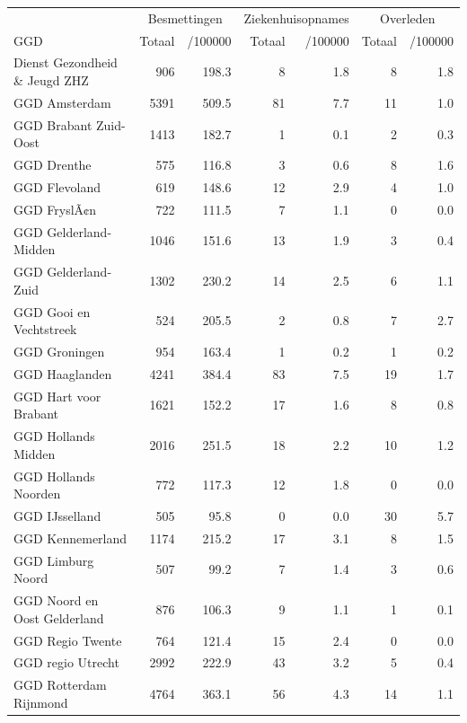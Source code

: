\documentclass[
  english,
  man,floatsintext]{apa6}
\begin{document}
\begin{table}[H]
\centering\begingroup\fontsize{10}{12}\selectfont

\begin{threeparttable}
\begin{tabular}{lrrrrrr}
\toprule
\multicolumn{1}{c}{ } & \multicolumn{2}{c}{Besmettingen} & \multicolumn{2}{c}{Ziekenhuisopnames} & \multicolumn{2}{c}{Overleden} \\
\cmidrule(l{3pt}r{3pt}){2-3} \cmidrule(l{3pt}r{3pt}){4-5} \cmidrule(l{3pt}r{3pt}){6-7}
GGD & Totaal & /100000 & Totaal & /100000 & Totaal & /100000\\
\midrule
Dienst Gezondheid \& Jeugd ZHZ & 906 & 198.3 & 8 & 1.8 & 8 & 1.8\\
GGD Amsterdam & 5391 & 509.5 & 81 & 7.7 & 11 & 1.0\\
GGD Brabant Zuid-Oost & 1413 & 182.7 & 1 & 0.1 & 2 & 0.3\\
GGD Drenthe & 575 & 116.8 & 3 & 0.6 & 8 & 1.6\\
GGD Flevoland & 619 & 148.6 & 12 & 2.9 & 4 & 1.0\\
GGD FryslÃ¢n & 722 & 111.5 & 7 & 1.1 & 0 & 0.0\\
GGD Gelderland-Midden & 1046 & 151.6 & 13 & 1.9 & 3 & 0.4\\
GGD Gelderland-Zuid & 1302 & 230.2 & 14 & 2.5 & 6 & 1.1\\
GGD Gooi en Vechtstreek & 524 & 205.5 & 2 & 0.8 & 7 & 2.7\\
GGD Groningen & 954 & 163.4 & 1 & 0.2 & 1 & 0.2\\
GGD Haaglanden & 4241 & 384.4 & 83 & 7.5 & 19 & 1.7\\
GGD Hart voor Brabant & 1621 & 152.2 & 17 & 1.6 & 8 & 0.8\\
GGD Hollands Midden & 2016 & 251.5 & 18 & 2.2 & 10 & 1.2\\
GGD Hollands Noorden & 772 & 117.3 & 12 & 1.8 & 0 & 0.0\\
GGD IJsselland & 505 & 95.8 & 0 & 0.0 & 30 & 5.7\\
GGD Kennemerland & 1174 & 215.2 & 17 & 3.1 & 8 & 1.5\\
GGD Limburg Noord & 507 & 99.2 & 7 & 1.4 & 3 & 0.6\\
GGD Noord en Oost Gelderland & 876 & 106.3 & 9 & 1.1 & 1 & 0.1\\
GGD Regio Twente & 764 & 121.4 & 15 & 2.4 & 0 & 0.0\\
GGD regio Utrecht & 2992 & 222.9 & 43 & 3.2 & 5 & 0.4\\
GGD Rotterdam Rijnmond & 4764 & 363.1 & 56 & 4.3 & 14 & 1.1\\

\end{tabular}
\end{threeparttable}
\end{table}
\end{document}
